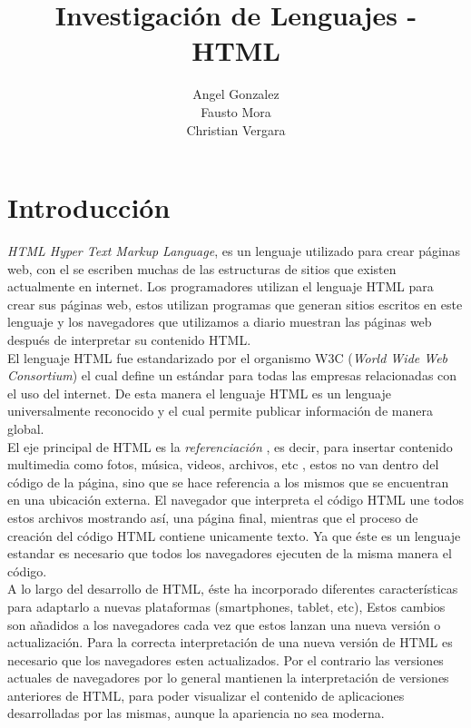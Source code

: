 \documentclass[11pt]{article} %
\title{Investigación de Lenguajes - HTML}
\author{Angel Gonzalez\\ Fausto Mora\\Christian Vergara}
\begin{document}
\maketitle

\section{Introducción}
\newcommand{\oops}[1]{\textit{#1}}

\noindent \emph{HTML \oops{{\color{black}Hyper Text Markup Language}}}, es un lenguaje utilizado para crear páginas web, con el se escriben muchas de las estructuras de sitios que existen actualmente en internet.
Los programadores utilizan el lenguaje HTML para crear sus páginas web, estos utilizan programas que generan sitios escritos en este lenguaje y los navegadores que utilizamos a diario muestran las páginas web después de interpretar su contenido HTML.\\

\noindent El lenguaje HTML fue estandarizado por el organismo W3C (\oops{World Wide Web Consortium}) el cual define un estándar para todas las empresas relacionadas con el uso del internet. De esta manera el lenguaje HTML es un lenguaje universalmente reconocido y el cual permite publicar información de manera global.\\

\noindent El eje principal de HTML es la \oops{referenciación} , es decir, para insertar contenido multimedia como fotos, música, videos, archivos, etc , estos no van dentro del código de la página, sino que se hace referencia a los mismos que se encuentran en una ubicación externa. El navegador que interpreta el código HTML une todos estos archivos mostrando así, una página final, mientras que el proceso de creación del código HTML contiene unicamente texto. Ya que éste es un lenguaje estandar es necesario que todos los navegadores ejecuten de la misma manera el código.\\

\noindent A lo largo del desarrollo de HTML, éste ha incorporado diferentes características para adaptarlo a nuevas plataformas (smartphones, tablet, etc), Estos cambios son añadidos a los navegadores cada vez que estos lanzan una nueva versión o actualización. Para la correcta interpretación de una nueva versión de HTML es necesario que los navegadores esten actualizados. Por el contrario las versiones actuales de navegadores por lo general mantienen la interpretación de versiones anteriores de HTML, para poder visualizar el contenido de aplicaciones desarrolladas por las mismas, aunque la apariencia no sea moderna.\\
\end{document}
